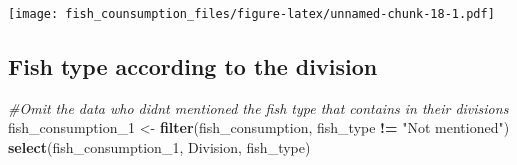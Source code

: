 \documentclass[
]{article}
\newenvironment{Shaded}{\begin{snugshade}}{\end{snugshade}}
\newcommand{\CommentTok}[1]{\textcolor[rgb]{0.56,0.35,0.01}{\textit{#1}}}
\newcommand{\FunctionTok}[1]{\textcolor[rgb]{0.13,0.29,0.53}{\textbf{#1}}}
\newcommand{\NormalTok}[1]{#1}
\newcommand{\OtherTok}[1]{\textcolor[rgb]{0.56,0.35,0.01}{#1}}
\newcommand{\SpecialCharTok}[1]{\textcolor[rgb]{0.81,0.36,0.00}{\textbf{#1}}}
\newcommand{\StringTok}[1]{\textcolor[rgb]{0.31,0.60,0.02}{#1}}
\begin{document}
\texttt{[image: fish\_counsumption\_files/figure-latex/unnamed-chunk-18-1.pdf]}

\hypertarget{fish-type-according-to-the-division}{%
\subsection{Fish type according to the
division}\label{fish-type-according-to-the-division}}

\begin{Shaded}
\begin{Highlighting}[]
\CommentTok{\#Omit the data who didn\textquotesingle{}t mentioned the fish type that contains in their divisions}
\NormalTok{fish\_consumption\_1 }\OtherTok{\textless{}{-}} \FunctionTok{filter}\NormalTok{(fish\_consumption, fish\_type }\SpecialCharTok{!=} \StringTok{"Not mentioned"}\NormalTok{) }
                    \FunctionTok{select}\NormalTok{(fish\_consumption\_1, Division, fish\_type)}
\end{Highlighting}
\end{Shaded}
\end{document}
